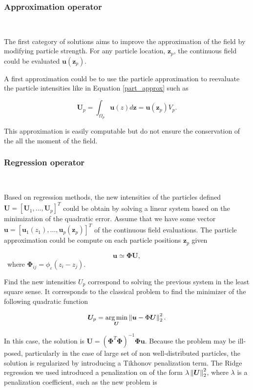 \subsubsection{Approximation operator}~\label{interpOp}

The first category of solutions aims to improve the approximation of the  field by modifying particle strength. For any particle location, $\bm z_p$, the continuous field could be evaluated $\bm u(\bm z_p)$.

A first approximation could be to use the particle approximation to reevaluate the particle intensities like in Equation \eqref{part_approx} such as

\begin{equation*}
	\bm U_p = \int_{\Omega_p} \bm u(z) d\bm z = \bm u(\bm z_p) V_p.
\end{equation*}

This approximation is easily computable but do not ensure the conservation of the all the moment of the field.

\subsubsection{Regression operator}~\label{regressionOperator}

Based on regression methods, the new intensities of the particles defined $\bm{U} = [\bm U_1, \dots, \bm U_p]^T$ could be obtain by solving a linear system based on the minimization of the quadratic error. Assume that we have some vector $\bm{u} = [\bm u_1(z_1), \dots, \bm u_p(\bm z_p)]^T$ of the continuous field evaluations. The particle approximation could be compute on each particle positions $\bm z_p$ given

\begin{equation*}
	\bm{u} \simeq \bm \Phi \bm{U},
\end{equation*}~where $\bm \Phi_{ij} = \phi_\varepsilon(z_i - z_j)$.

Find the new intensities $U_p$ correspond to solving the previous system in the least square sense. It corresponds to the classical problem to find the minimizer of the following quadratic function

\begin{equation*}
	\bm{U}_p = \operatorname*{arg\,min}_{\bm{U}} \left\lVert \bm{u} - \Phi \bm{U} \right\rVert^2_2.
\end{equation*}


In this case, the solution is $\bm U = (\bm \Phi^T \bm \Phi)^{-1} \bm \Phi \bm{u}$. Because the problem may be ill-posed, particularly in the case of large set of non well-distributed particles, the solution is regularized by introducing a Tikhonov penalization term. The Ridge regression we used introduced a penalization on of the form $\lambda \left\lVert \bm U \right\rVert_2^2$, where $\lambda$ is a penalization coefficient, such as the new problem is

